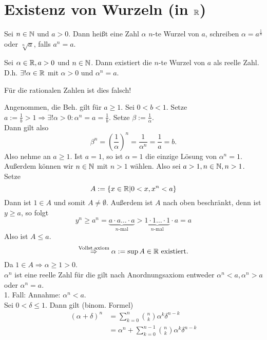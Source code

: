 \documentclass[../ana1.tex]{subfiles}
\begin{document}
\setcounter{section}{6}

\section{Existenz von Wurzeln (in $\mathbb{R}$)}
Sei $n\in\mathbb{N}$ und $a>0$. Dann heißt eine Zahl $\alpha$ $n$-te Wurzel von $a$, schreiben $\alpha = a^{\frac{1}{n}}$ oder $\sqrt[n]{a}$, falls $a^n = a$.
\begin{satz}
	Sei $\alpha \in\mathbb{R}, a>0$ und $n\in\mathbb{N}$. Dann existiert die $n$-te Wurzel von $a$ als reelle Zahl. D.h. $\exists ! \alpha\in\mathbb{R}$ mit $\alpha>0$ und $\alpha^n = a$.
\end{satz}
\begin{bem}
	Für die rationalen Zahlen ist dies falsch!
\end{bem}
\begin{bew}
	Angenommen, die Beh. gilt für $a\geq 1$. Sei $0<b<1$. Setze $a :=\frac{1}{b}>1\Rightarrow \exists !\alpha>0:\alpha^n = a = \frac{1}{b}$. Setze $\beta := \frac{1}{\alpha}$.\\
	Dann gilt also $$\beta^n = \left(\frac{1}{\alpha}\right)^n = \frac{1}{\alpha^n} = \frac{1}{a} = b.$$
	Also nehme an $a\geq 1$. Ist $a=1$, so ist $\alpha = 1$ die einzige Lösung von $\alpha^n = 1$. Außerdem können wir $n\in\mathbb{N}$ mit $n>1$ wählen. Also sei $a>1,n\in\mathbb{N},n>1$. Setze
	$$A := \{x\in\mathbb{R}|0<x, x^n<a\}$$
	Dann ist $1\in A$ und somit $A\neq\emptyset$. Außerdem ist $A$ nach oben beschränkt, denn ist $y \geq a$, so folgt
	$$y^n \geq a^n = \underbrace{a \cdot a \ldots \cdot a}_{n\text{-mal}} > \underbrace{1 \cdot 1 \ldots \cdot 1}_{n\text{-mal}} \cdot a = a$$
	Also ist $A \leq a$.
	$$\overset{\text{Vollst.axiom}}{\Rightarrow} \alpha := \sup A \in\mathbb{R} \text{ existiert}.$$
	Da $1\in A \Rightarrow \alpha \geq 1 > 0$.\\
	$\alpha^n$ ist eine reelle Zahl für die gilt nach Anordnungsaxiom entweder $\alpha^n <a, \alpha^n >a$ oder $\alpha^n = a$.\\
	1. Fall: Annahme: $\alpha^n <a$.\\
	Sei $0<\delta\leq 1$. Dann gilt (binom. Formel)
	\begin{align*}
		(\alpha + \delta)^n & = \sum_{k=0}^{n} \binom{n}{k} \alpha^k\delta^{n-k}                                                                                                            \\
		                    & = \alpha^n + \sum_{k=0}^{n-1} \binom{n}{k} \alpha^k\delta^{n-k}                                                                                               \\

\end{align*}
\end{bew}
\end{document}
